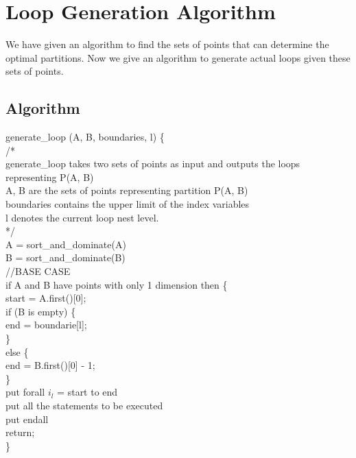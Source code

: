 \chapter{Loop Generation Algorithm}
We have given an algorithm to find the sets of points that can determine the optimal partitions. Now we give an algorithm to generate actual loops given these sets of points. \\

\section{Algorithm}


generate\_loop (A, B, boundaries, l) \{ \\

\noindent /* \\
generate\_loop takes two sets of points as input and outputs the loops representing P(A, B) \\

\noindent A, B are the sets of points representing partition P(A, B) \\
boundaries contains the upper limit of the index variables \\
l denotes the current loop nest level. \\
*/ \\

\indent	A = sort\_and\_dominate(A) \\
\indent	B = sort\_and\_dominate(B) \\

\indent	//BASE CASE \\
\indent	if A and B have points with only 1 dimension then \{ \\
\indent \indent		start = A.first()[0]; \\
\indent		if (B is empty) \{ \\
\indent\indent			end = boundarie[l]; \\
\indent		\} \\
\indent		else \{ \\
\indent\indent			end = B.first()[0] - 1; \\
\indent		\} \\
\indent		put forall $i_l$ = start to end \\
\indent		put all the statements to be executed \\
\indent		put endall \\

\indent		return; \\
\indent	\} \\
	
